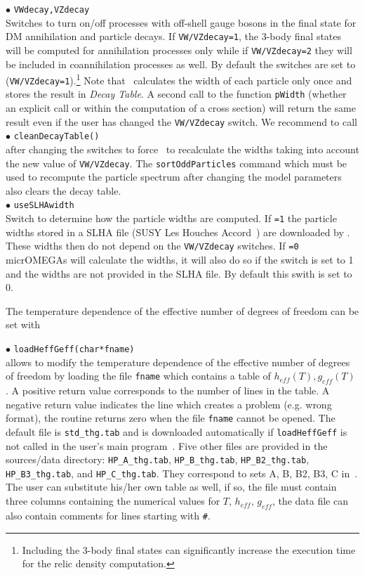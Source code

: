 \documentclass[12pt,a4paper]{article}
\begin{document}
\noindent
$\bullet$ \verb|VWdecay,VZdecay|\\
Switches to turn on/off  processes with off-shell gauge bosons in the final state for DM annihilation and particle decays.
If \verb|VW/VZdecay=1|, the  3-body final states will be computed for annihilation processes only while 
if \verb|VW/VZdecay=2| they will be included in coannihilation processes as well.
By  default  the switches are set to (\verb|VW/VZdecay=1|).\footnote{Including the 3-body final states can significantly increase the execution time for the relic density computation.}
Note that \micro\ calculates the width of each particle only once and stores the
result in {\it Decay Table}.  A second call to the function \verb|pWidth| (whether an explicit call or within the computation of a cross section)   will return the same result  even if the user has changed the {\tt VW/VZdecay} switch.  
We recommend to call\\[2mm]
$\bullet$ \verb|cleanDecayTable()| \\
after changing the switches to force \micro\ to recalculate the widths taking into account  the new value of {\tt VW/VZdecay}.
The   {\tt sortOddParticles} command which must be used 
to recompute the particle spectrum after changing the model parameters also clears  the decay table.\\[2mm]
%
$\bullet$ \verb|useSLHAwidth|\\
Switch to  determine how the particle widths are computed. 
If {\tt =1} the particle widths  stored in  a SLHA file (SUSY Les Houches Accord~\cite{Skands:2003cj})  are downloaded by \micro. 
These widths  then do not depend on  the {\tt VW/VZdecay} switches. 
If {\tt =0} micrOMEGAs will calculate the widths, it will also do so if the switch is set to 1 and the widths  are not provided in the SLHA file. By default this swith is set to 0. 


 

The temperature dependence of the effective number of degrees of freedom can be set with

\noindent$\bullet$ \verb|loadHeffGeff(char*fname)|\\
allows to modify the temperature dependence of the effective number of degrees of freedom
by loading the file \verb|fname| which contains a table of $h_{eff}(T), g_{eff}(T)$ . 
A positive  return value corresponds to the number of lines in the table. A negative return value indicates the line which creates a problem (e.g. wrong format), the routine returns zero when the file \verb|fname| cannot be opened.  The default file is \verb|std_thg.tab| and is downloaded automatically if 
\verb|loadHeffGeff| is not called in the user's main program~\cite{Gondolo:2004sc}. Five other files are provided in the sources/data directory:  \verb|HP_A_thg.tab|,  \verb|HP_B_thg.tab|, \verb|HP_B2_thg.tab|,  \verb|HP_B3_thg.tab|,    and \verb|HP_C_thg.tab|. They   correspond to sets A, B, B2, B3, C in~\cite{Hindmarsh:2005ix}.
The user can substitute his/her own table as well, if so, the file must contain three columns containing the numerical values for $T$, $h_{eff}$, $g_{eff}$, the data file can also contain comments for lines starting with \verb|#|.
\end{document}
